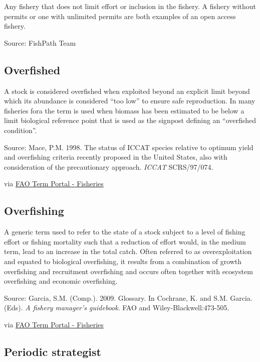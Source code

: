 \documentclass[
  11pt,
]{book}
\begin{document}
Any fishery that does not limit effort or inclusion in the fishery. A fishery without permits or one with unlimited permits are both examples of an open access fishery.

Source: FishPath Team

\hypertarget{overfished}{%
\subsection{Overfished}\label{overfished}}

A stock is considered overfished when exploited beyond an explicit limit beyond which its abundance is considered ``too low'' to ensure safe reproduction. In many fisheries fora the term is used when biomass has been estimated to be below a limit biological reference point that is used as the signpost defining an ``overfished condition''.

Source: Mace, P.M. 1998. The status of ICCAT species relative to optimum yield and overfishing criteria recently proposed in the United States, also with consideration of the precautionary approach. \emph{ICCAT} SCRS/97/074.

via \href{http://www.fao.org/fishery/glossary/en}{FAO Term Portal - Fisheries}

\hypertarget{overfishing}{%
\subsection{Overfishing}\label{overfishing}}

A generic term used to refer to the state of a stock subject to a level of fishing effort or fishing mortality such that a reduction of effort would, in the medium term, lead to an increase in the total catch. Often referred to as overexploitation and equated to biological overfishing, it results from a combination of growth overfishing and recruitment overfishing and occurs often together with ecosystem overfishing and economic overfishing.

Source: Garcia, S.M. (Comp.). 2009. Glossary. In Cochrane, K. and S.M. Garcia. (Eds). \emph{A fishery manager's guidebook}. FAO and Wiley-Blackwell:473-505.

via \href{http://www.fao.org/fishery/glossary/en}{FAO Term Portal - Fisheries}

\hypertarget{periodic-strategist}{%
\subsection{Periodic strategist}\label{periodic-strategist}}
\end{document}
